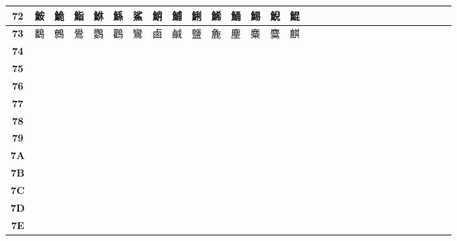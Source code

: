 \begin{table}[H]
\begin{tabular}{|Sc|Sc|Sc|Sc|Sc|Sc|Sc|Sc|Sc|Sc|Sc|Sc|Sc|Sc|Sc|}
\textbf{72} & 鮟 & 鮠 & 鮨 & 鮴 & 鯀 & 鯊 & 鮹 & 鯆 & 鯏 & 鯑 & 鯒 & 鯣 & 鯢 & 鯤 \\ \hline
\textbf{73} & 鷭 & 鷯 & 鷽 & 鸚 & 鸛 & 鸞 & 鹵 & 鹹 & 鹽 & 麁 & 麈 & 麋 & 麌 & 麒 \\ \hline
\textbf{74} &  &  &  &  &  &  &  &  &  &  &  &  &  &  \\ \hline
\textbf{75} &  &  &  &  &  &  &  &  &  &  &  &  &  &  \\ \hline
\textbf{76} &  &  &  &  &  &  &  &  &  &  &  &  &  &  \\ \hline
\textbf{77} &  &  &  &  &  &  &  &  &  &  &  &  &  &  \\ \hline
\textbf{78} &  &  &  &  &  &  &  &  &  &  &  &  &  &  \\ \hline
\textbf{79} &  &  &  &  &  &  &  &  &  &  &  &  &  &  \\ \hline
\textbf{7A} &  &  &  &  &  &  &  &  &  &  &  &  &  &  \\ \hline
\textbf{7B} &  &  &  &  &  &  &  &  &  &  &  &  &  &  \\ \hline
\textbf{7C} &  &  &  &  &  &  &  &  &  &  &  &  &  &  \\ \hline
\textbf{7D} &  &  &  &  &  &  &  &  &  &  &  &  &  &  \\ \hline
\textbf{7E} &  &  &  &  &  &  &  &  &  &  &  &  &  &  \\ \hline
\end{tabular}
\end{table}

